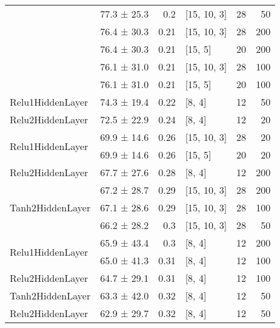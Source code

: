 \begin{table*}[h]
\begin{tabular}{llrlrr}
                                            & 77.3 ± 25.3 &  0.2  & [15, 10, 3]    &         28 &       50 \\
                                            & 76.4 ± 30.3 &  0.21 & [15, 10, 3]    &         28 &      200 \\
                                            & 76.4 ± 30.3 &  0.21 & [15, 5]        &         20 &      200 \\
                                            & 76.1 ± 31.0 &  0.21 & [15, 10, 3]    &         28 &      100 \\
                                            & 76.1 ± 31.0 &  0.21 & [15, 5]        &         20 &      100 \\
 \hline
Relu1HiddenLayer                    & 74.3 ± 19.4 &  0.22 & [8, 4]         &         12 &       50 \\
 \hline
Relu2HiddenLayer                    & 72.5 ± 22.9 &  0.24 & [8, 4]         &         12 &       20 \\
 \hline
\multirow{2}{*}{Relu1HiddenLayer}   & 69.9 ± 14.6 &  0.26 & [15, 10, 3]    &         28 &       20 \\
                                            & 69.9 ± 14.6 &  0.26 & [15, 5]        &         20 &       20 \\
 \hline
Relu2HiddenLayer                    & 67.7 ± 27.6 &  0.28 & [8, 4]         &         12 &      200 \\
 \hline
\multirow{3}{*}{Tanh2HiddenLayer}   & 67.2 ± 28.7 &  0.29 & [15, 10, 3]    &         28 &      200 \\
                                            & 67.1 ± 28.6 &  0.29 & [15, 10, 3]    &         28 &      100 \\
                                            & 66.2 ± 28.2 &  0.3  & [15, 10, 3]    &         28 &       50 \\
 \hline
\multirow{2}{*}{Relu1HiddenLayer}   & 65.9 ± 43.4 &  0.3  & [8, 4]         &         12 &      200 \\
                                            & 65.0 ± 41.3 &  0.31 & [8, 4]         &         12 &      100 \\
 \hline
Relu2HiddenLayer                    & 64.7 ± 29.1 &  0.31 & [8, 4]         &         12 &      100 \\
 \hline
Tanh2HiddenLayer                    & 63.3 ± 42.0 &  0.32 & [8, 4]         &         12 &       50 \\
 \hline
Relu2HiddenLayer                    & 62.9 ± 29.7 &  0.32 & [8, 4]         &         12 &       50 \\

\end{tabular}
\end{table*}
